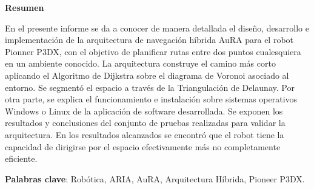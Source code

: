 \documentclass[11pt,twoside,A5]{article}
\begin{document}
\maketitle 
\fancyhead{} 
\fancyfoot{}
\fancyfoot[RO,LE]{\thepage}

\begin{center}
{\bf\small Resumen}

\vspace{-3mm} \hspace{.05in}\parbox{4.5in} {{\small %

En el presente informe se da a conocer de manera detallada el diseño, desarrollo e implementación 
de la arquitectura de navegación híbrida AuRA para el robot Pionner P3DX, 
con el objetivo de planificar rutas entre dos puntos cualesquiera en un ambiente conocido.
La arquitectura construye el camino más corto aplicando el Algoritmo de Dijkstra sobre el diagrama de Voronoi asociado
al entorno. Se segmentó el espacio a través de la Triangulación de Delaunay.
Por otra parte, se explica el funcionamiento e instalación sobre sistemas operativos Windows o Linux de la aplicación de software 
desarrollada. Se exponen los resultados y conclusiones del conjunto de pruebas 
realizadas para validar la arquitectura. En los resultados alcanzados se encontró 
que el robot tiene la capacidad de dirigirse por el espacio efectivamente más no completamente eficiente. 

 \textbf{Palabras clave}: Robótica, ARIA, AuRA, Arquitectura Híbrida, Pioneer P3DX.}}
\end{center}
\pagebreak
\end{document}
